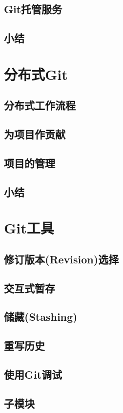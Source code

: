 \documentclass{book}
\begin{document}
	\section{Git托管服务}
	\section{小结}

\chapter{分布式Git}
	\section{分布式工作流程}
	\section{为项目作贡献}
	\section{项目的管理}
	\section{小结}

\chapter{Git工具}
	\section{修订版本(Revision)选择}
	\section{交互式暂存}
	\section{储藏(Stashing)}
	\section{重写历史}
	\section{使用Git调试}
	\section{子模块}
\end{document}
